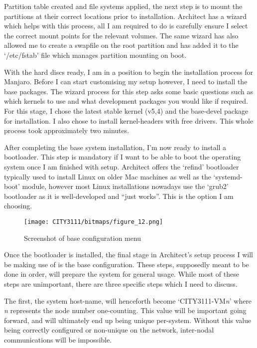Partition table created and file systems applied, the next step is to mount the partitions at their correct locations prior to installation. Architect has a wizard which helps with this process, all I am required to do is carefully ensure I select the correct mount points for the relevant volumes. The same wizard has also allowed me to create a swapfile on the root partition and has added it to the `/etc/fstab' file which manages partition mounting on boot.

With the hard discs ready, I am in a position to begin the installation process for Manjaro. Before I can start customising my setup however, I need to install the base packages. The wizard process for this step asks some basic questions such as which kernels to use and what development packages you would like if required. For this stage, I chose the latest stable kernel (v5,4) and the base-devel package for installation. I also chose to install kernel-headers with free drivers. This whole process took approximately two minutes.

After completing the base system installation, I'm now ready to install a bootloader. This step is mandatory if I want to be able to boot the operating system once I am finished with setup. Architect offers the `refind' bootloader typically used to install Linux on older Mac machines as well as the `systemd-boot' module, however most Linux installations nowadays use the `grub2' bootloader as it is well-developed and ``just works''. This is the option I am choosing.

\begin{figure}[H]
    \texttt{[image: CITY3111/bitmaps/figure\_12.png]}
    \caption{Screenshot of base configuration menu}
    \label{figure_12}
\end{figure}

Once the bootloader is installed, the final stage in Architect's setup process I will be making use of is the base configuration. These steps, supposedly meant to be done in order, will prepare the system for general usage. While most of these steps are unimportant, there are three specific steps which I need to discuss.

The first, the system host-name, will henceforth become `CITY3111-VM\emph{n}' where \emph{n} represents the node number one-counting. This value will be important going forward, and will ultimately end up being unique per-system. Without this value being correctly configured or non-unique on the network, inter-nodal communications will be impossible.

